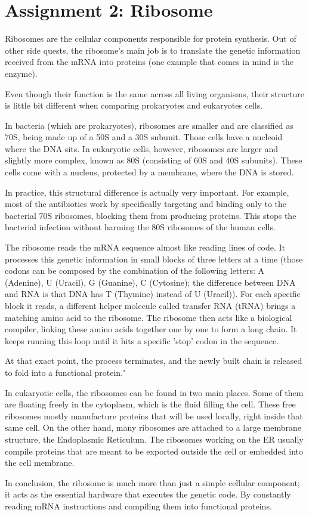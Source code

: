 \chapter{Assignment 2: Ribosome}

Ribosomes are the cellular components responsible for protein synthesis. 
Out of other side quests, the ribosome's main job is to translate the genetic information received from the mRNA into proteins (one example that comes in mind is the enzyme). 

Even though their function is the same across all living organisms, their structure is little bit different when comparing prokaryotes and eukaryotes cells. 

In bacteria (which are prokaryotes), ribosomes are smaller and are classified as 70S, being made up of a 50S and a 30S subunit. \cite{alberts2014molecular} Those cells have a nucleoid where the DNA sits.
In eukaryotic cells, however, ribosomes are larger and slightly more complex, known as 80S (consisting of 60S and 40S subunits). \cite{alberts2014molecular} These cells come with a nucleus, protected by a membrane, where the DNA is stored.

In practice, this structural difference is actually very important. For example, most of the antibiotics work by specifically targeting and binding only to the bacterial 70S ribosomes, blocking them from producing proteins. 
This stops the bacterial infection without harming the 80S ribosomes of the human cells.

The ribosome reads the mRNA sequence almost like reading lines of code. 
It processes this genetic information in small blocks of three letters at a time (those codons can be composed by the combination of the following letters: A (Adenine), U (Uracil), G (Guanine), C (Cytosine); the difference between DNA and RNA is that DNA has T (Thymine) instead of U (Uracil)). For each specific block it reads, a different helper molecule called transfer RNA (tRNA) brings a matching amino acid to the ribosome.  
The ribosome then acts like a biological compiler, linking these amino acids together one by one to form a long chain. 
It keeps running this loop until it hits a specific 'stop' codon in the sequence. 

At that exact point, the process terminates, and the newly built chain is released to fold into a functional protein." \cite{nelson2017lehninger}

In eukaryotic cells, the ribosomes can be found in two main places. 
Some of them are floating freely in the cytoplasm, which is the fluid filling the cell. These free ribosomes mostly manufacture proteins that will be used locally, right inside that same cell. 
On the other hand, many ribosomes are attached to a large membrane structure, the Endoplasmic Reticulum.
The ribosomes working on the ER usually compile proteins that are meant to be exported outside the cell or embedded into the cell membrane. \cite{steitz2008structural}

In conclusion, the ribosome is much more than just a simple cellular component; 
it acts as the essential hardware that executes the genetic code. 
By constantly reading mRNA instructions and compiling them into functional proteins.